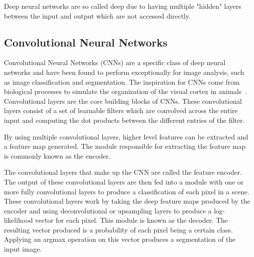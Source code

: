 Deep neural networks are so called deep due to having multiple "hidden" layers between the input and output which are not accessed directly.

\subsection{Convolutional Neural Networks}\label{section:background-cnn}
Convolutional Neural Networks (CNNs) are a specific class of deep neural networks and have been found to perform exceptionally for image analysis, such as image classification and segmentation.
The inspiration for CNNs come from biological processes to simulate the organization of the visual cortex in animals~\cite{cnnbiology}.
Convolutional layers are the core building blocks of CNNs.
These convolutional layers consist of a set of learnable filters which are convolved across the entire input and computing the dot products between the different entries of the filter.

By using multiple convolutional layers, higher level features can be extracted and a feature map generated.
The module responsible for extracting the feature map is commonly known as the encoder.

The convolutional layers that make up the CNN are called the feature encoder.
The output of these convolutional layers are then fed into a module with one or more fully convolutional layers to produce a classification of each pixel in a scene.
These convolutional layers work by taking the deep feature maps produced by the encoder and using deconvolutional or upsampling layers to produce a log-likelihood vector for each pixel.
This module is known as the decoder.
The resulting vector produced is a probability of each pixel being a certain class.
Applying an argmax operation on this vector produces a segmentation of the input image.
